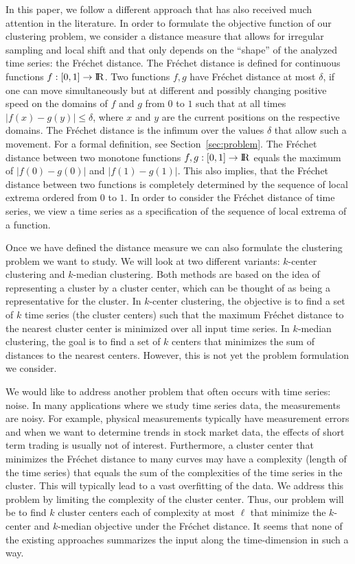 \documentclass[11pt, letter]{article}
\newcommand{\secref}[1]{Section~\ref{sec:#1}}
\newcommand{\Frechet}{Fr\'echet\xspace}
\renewcommand{\Re}{{\rm I\!\hspace{-0.025em} R}}
\begin{document}
In this paper, we follow a different approach that has also received much attention in the literature. In order to formulate the objective function of our clustering problem, we consider a distance measure that allows for irregular sampling and local shift and that only depends on the ``shape'' of the analyzed time series: the \Frechet{} distance.
The \Frechet{} distance is defined for continuous functions $f:[0,1]\rightarrow
\Re$.
Two functions $f,g$ have \Frechet{} distance at most $\delta$, if one can move simultaneously 
but at different and possibly changing positive speed on the domains of $f$ and $g$ from $0$ to $1$ such 
that at all times $|f(x)-g(y)|\le \delta$, where $x$ and $y$ are the current positions on the respective domains. 
The \Frechet{} distance is the infimum over the values $\delta$ that allow such a movement. For a formal
definition, see \secref{problem}. The \Frechet{} distance between two monotone
functions $f,g:[0,1] \rightarrow \Re$ equals the maximum of $|f(0)-g(0)|$ and $|f(1)-g(1)|$. 
This also implies, that the \Frechet{} distance between two functions is completely 
determined by the sequence of local extrema ordered from $0$ to $1$. 
In order to consider the \Frechet{} distance of time series, we view a time series as a specification of
the sequence of local extrema of a function. 


Once we have defined the distance measure we can also formulate the clustering problem we want to study.
We will look at two different variants: $k$-center clustering and $k$-median clustering. Both methods are
based on the idea of representing a cluster by a cluster center, which can be thought of as being a
representative for the cluster. In $k$-center clustering, the objective is to find a set of $k$ time series (the cluster centers)
such that the maximum \Frechet{} distance to the nearest cluster center is minimized over all input time series.
In $k$-median clustering, the goal is to find a set of $k$ centers that minimizes the sum of distances to 
the nearest centers. However, this is not yet the problem formulation we consider.

We would like to address another problem that often occurs with time series: noise. In many applications where
we study time series data, the measurements are noisy. For example, physical measurements typically have measurement errors
and when we want to determine trends in stock market data, the effects of short term trading is usually not of interest.
Furthermore, a cluster center that minimizes the \Frechet{} distance to many curves may have a complexity (length of the time series)
that equals the sum of the complexities of the time series in the cluster. This will typically lead to a vast overfitting
of the data. We address this problem by limiting the complexity of the cluster center. Thus,
our problem will be to find $k$ cluster centers each of complexity at most $\ell$ that minimize the $k$-center and
$k$-median objective under the \Frechet{} distance.
It seems that  none of the existing approaches summarizes the
input along the time-dimension in such a way.  
\end{document}
